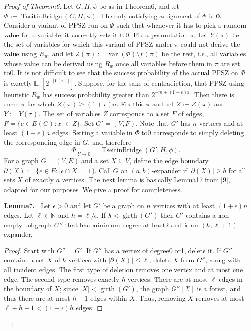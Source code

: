 \documentclass[10pt,a4paper]{article}
\newenvironment{authorclaim}[1]{\par\medskip\noindent\textbf{#1.}\ \ignorespaces}{\par\medskip}
\begin{document}
\begin{proof}[Proof of Theorem6]
Let $G,H,\phi$ be as in Theorem6, and let $\Phi:=\operatorname{TseitinBridge}(G,H,\phi)$. The only satisfying assignment of $\Phi$ is $\mathbf0$. Consider a variant of PPSZ run on $\Phi$ such that whenever it has to pick a random value for a variable, it correctly sets it to0. Fix a permutation $\pi$. Let $Y(\pi)$ be the set of variables for which this variant of PPSZ under $\pi$ could not derive the value using $R_w$, and let $Z(\pi):=\operatorname{var}(\Phi)\setminus Y(\pi)$ be the rest, i.e., all variables whose value can be derived using $R_w$ once all variables before them in $\pi$ are set to0. It is not difficult to see that the success probability of the actual PPSZ on $\Phi$ is exactly $\mathbb E_\pi[2^{-|Y(\pi)|}]$.
Suppose, for the sake of contradiction, that PPSZ using heuristic $R_w$ has success probability greater than $2^{-m+(1+\epsilon)n}$. Then there is some $\pi$ for which $Z(\pi)\ge(1+\epsilon)n$. Fix this $\pi$ and set $Z:=Z(\pi)$ and $Y:=Y(\pi)$. The set of variables $Z$ corresponds to a set $F$ of edges, $F=\{e\in E(G):x_e\in Z\}$. Set $G'=(V,F)$. Note that $G'$ has $n$ vertices and at least $(1+\epsilon)n$ edges. Setting a variable in $\Phi$ to0 corresponds to simply deleting the corresponding edge in $G$, and therefore
\[
\Phi|_{Y\mapsto0}=\operatorname{TseitinBridge}(G',H,\phi).
\]
For a graph $G=(V,E)$ and a set $X\subseteq V$, define the edge boundary $\partial(X):=\{e\in E:|e\cap X|=1\}$. Call $G$ an $(a,b)$-expander if $|\partial(X)|\ge b$ for all sets $X$ of exactly $a$ vertices. The next lemma is basically Lemma17 from [9], adapted for our purposes. We give a proof for completeness.
\begin{authorclaim}{Lemma7}
Let $\epsilon>0$ and let $G'$ be a graph on $n$ vertices with at least $(1+\epsilon)n$ edges. Let $\ell\in\mathbb N$ and $h=\ell/\epsilon$. If $h<\operatorname{girth}(G')$ then $G'$ contains a non-empty subgraph $G''$ that has minimum degree at least2 and is an $(h,\ell+1)$-expander.
\end{authorclaim}
\begin{proof}
Start with $G''=G'$. If $G''$ has a vertex of degree0 or1, delete it. If $G''$ contains a set $X$ of $h$ vertices with $|\partial(X)|\le\ell$, delete $X$ from $G''$, along with all incident edges.
The first type of deletion removes one vertex and at most one edge. The second type removes exactly $h$ vertices. There are at most $\ell$ edges in the boundary of $X$; since $|X|<\operatorname{girth}(G')$, the graph $G''[X]$ is a forest, and thus there are at most $h-1$ edges within $X$. Thus, removing $X$ removes at most $\ell+h-1<(1+\epsilon)h$ edges.

\end{proof}
\end{proof}
\end{document}
